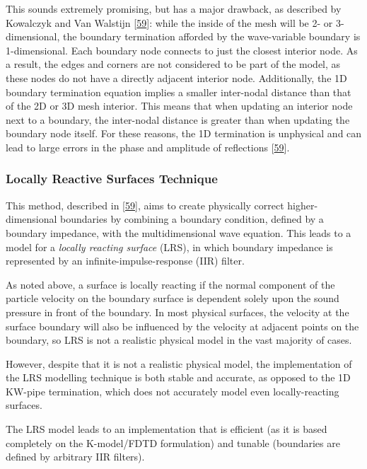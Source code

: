 \documentclass[]{scrreprt}
\begin{document}
This sounds extremely promising, but has a major drawback, as described
by Kowalczyk and Van Walstijn
{[}\protect\hyperlink{ref-kowalczykux5fmodelingux5f2008}{59}{]}: while
the inside of the mesh will be 2- or 3-dimensional, the boundary
termination afforded by the wave-variable boundary is 1-dimensional.
Each boundary node connects to just the closest interior node. As a
result, the edges and corners are not considered to be part of the
model, as these nodes do not have a directly adjacent interior node.
Additionally, the 1D boundary termination equation implies a smaller
inter-nodal distance than that of the 2D or 3D mesh interior. This means
that when updating an interior node next to a boundary, the inter-nodal
distance is greater than when updating the boundary node itself. For
these reasons, the 1D termination is unphysical and can lead to large
errors in the phase and amplitude of reflections
{[}\protect\hyperlink{ref-kowalczykux5fmodelingux5f2008}{59}{]}.

\subsubsection{Locally Reactive Surfaces
Technique}\label{locally-reactive-surfaces-technique}

This method, described in
{[}\protect\hyperlink{ref-kowalczykux5fmodelingux5f2008}{59}{]}, aims to
create physically correct higher-dimensional boundaries by combining a
boundary condition, defined by a boundary impedance, with the
multidimensional wave equation. This leads to a model for a
\emph{locally reacting surface} (LRS), in which boundary impedance is
represented by an infinite-impulse-response (IIR) filter.

As noted above, a surface is locally reacting if the normal component of
the particle velocity on the boundary surface is dependent solely upon
the sound pressure in front of the boundary. In most physical surfaces,
the velocity at the surface boundary will also be influenced by the
velocity at adjacent points on the boundary, so LRS is not a realistic
physical model in the vast majority of cases.

However, despite that it is not a realistic physical model, the
implementation of the LRS modelling technique is both stable and
accurate, as opposed to the 1D KW-pipe termination, which does not
accurately model even locally-reacting surfaces.

The LRS model leads to an implementation that is efficient (as it is
based completely on the K-model/FDTD formulation) and tunable
(boundaries are defined by arbitrary IIR filters).
\end{document}

